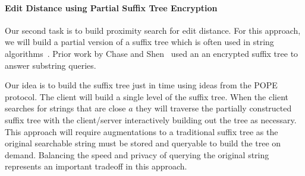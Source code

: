 \paragraph{Edit Distance using Partial Suffix Tree Encryption}
Our second task is to build proximity search for edit distance.  For this approach, we will build a partial version of a suffix tree which is often used in string algorithms~\cite{mccreight1976space}.  Prior work by Chase and Shen~\cite{chase2015substring} used an an encrypted suffix tree to answer substring queries.

Our idea is to build the suffix tree just in time using ideas from the POPE protocol.  The client will build a single level of the suffix tree.  When the client searches for strings that are close $a$ they will traverse the partially constructed suffix tree with the client/server interactively building out the tree as necessary.  This approach will require augmentations to a traditional suffix tree as the original searchable string must be stored and queryable to build the tree on demand.  Balancing the speed and privacy of querying the original string represents an important tradeoff in this approach.